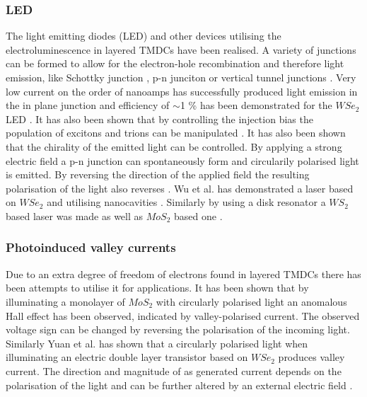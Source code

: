 \subsubsection{LED}

The light emitting diodes (LED) and other devices utilising the electroluminescence in layered TMDCs have been realised. A variety of junctions can be formed to allow for the electron-hole recombination and therefore light emission, like Schottky junction \cite{Sundaram2013}, p-n junciton \cite{Ross2014}\cite{Cheng2014}\cite{Pospischil2014} or vertical tunnel junctions \cite{Withers2015}. Very low current on the order of nanoamps has successfully produced light emission in the in plane junction and efficiency of $\sim$1 \% has been demonstrated for the $WSe_2$ LED \cite{Ross2014}\cite{Pospischil2014}. It has also been shown that by controlling the injection bias the population of excitons and trions can be manipulated \cite{Ross2014}\cite{Withers2015}\cite{Mak2016}. It has also been shown that the chirality of the emitted light can be controlled. By applying a strong electric field a p-n junction can spontaneously form and circularily polarised light is emitted. By reversing the direction of the applied field the resulting polarisation of the light also reverses \cite{Zhang2014b}. Wu et al. has demonstrated a laser based on $WSe_2$ and utilising nanocavities \cite{Wu2015}. Similarly by using a disk resonator a $WS_2$ based laser was made \cite{Ye2015} as well as $MoS_2$ based one \cite{Salehzadeh2015}.

\subsubsection{Photoinduced valley currents}

Due to an extra degree of freedom of electrons found in layered TMDCs there has been attempts to utilise it for applications. It has been shown that by illuminating a monolayer of $MoS_2$ with circularly polarised light an anomalous Hall effect has been observed, indicated by valley-polarised current. The observed voltage sign can be changed by reversing the polarisation of the incoming light\cite{Mak2014}. Similarly Yuan et al. has shown that a circularly polarised light when illuminating an electric double layer transistor based on $WSe_2$ produces valley current. The direction and magnitude of as generated current depends on the polarisation of the light and can be further altered by an external electric field \cite{Yuan2014}.

